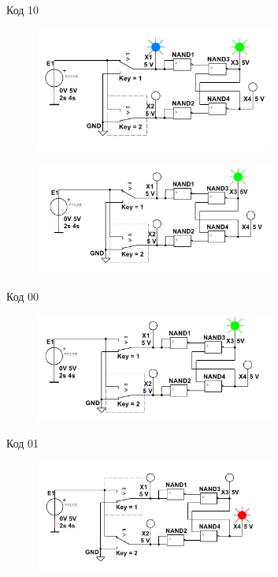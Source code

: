 \documentclass[spec, och, labwork]{shiza}
\begin{document}
Код 10

\begin{figure}[H]
    \centering
    \includegraphics[width=0.7\textwidth]{img/image4}
    \caption{}
\end{figure}

\begin{figure}[H]
    \centering
    \includegraphics[width=0.7\textwidth]{img/image5}
    \caption{}
\end{figure}

Код 00

\begin{figure}[H]
    \centering
    \includegraphics[width=0.7\textwidth]{img/image6}
    \caption{}
\end{figure}

Код 01

\begin{figure}[H]
    \centering
    \includegraphics[width=0.7\textwidth]{img/image7}
    \caption{}
\end{figure}
\end{document}
